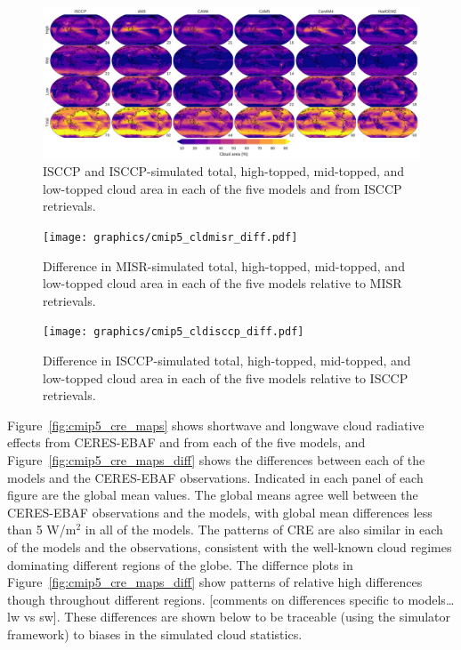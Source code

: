 \begin{figure}[htbp]
\centering
\includegraphics{graphics/cmip5_cldisccp.pdf}
\caption{\label{fig:cmip5_cldisccp_maps}ISCCP and ISCCP-simulated total,
high-topped, mid-topped, and low-topped cloud area in each of the five
models and from ISCCP retrievals.}\label{fig:cmip5ux5fcldisccpux5fmaps}
\end{figure}

\begin{figure}[htbp]
\centering
\texttt{[image: graphics/cmip5\_cldmisr\_diff.pdf]}
\caption{\label{fig:cmip5_cldmisr_maps_diff}Difference in MISR-simulated
total, high-topped, mid-topped, and low-topped cloud area in each of the
five models relative to MISR
retrievals.}\label{fig:cmip5ux5fcldmisrux5fmapsux5fdiff}
\end{figure}

\begin{figure}[htbp]
\centering
\texttt{[image: graphics/cmip5\_cldisccp\_diff.pdf]}
\caption{\label{fig:cmip5_cldisccp_maps_diff}Difference in
ISCCP-simulated total, high-topped, mid-topped, and low-topped cloud
area in each of the five models relative to ISCCP
retrievals.}\label{fig:cmip5ux5fcldisccpux5fmapsux5fdiff}
\end{figure}

Figure~\ref{fig:cmip5_cre_maps} shows shortwave and longwave cloud
radiative effects from CERES-EBAF and from each of the five models, and
Figure~\ref{fig:cmip5_cre_maps_diff} shows the differences between each
of the models and the CERES-EBAF observations. Indicated in each panel
of each figure are the global mean values. The global means agree well
between the CERES-EBAF observations and the models, with global mean
differences less than 5 W/m\(^2\) in all of the models. The patterns of
CRE are also similar in each of the models and the observations,
consistent with the well-known cloud regimes dominating different
regions of the globe. The differnce plots in
Figure~\ref{fig:cmip5_cre_maps_diff} show patterns of relative high
differences though throughout different regions. {[}comments on
differences specific to models\ldots{}lw vs sw{]}. These differences are
shown below to be traceable (using the simulator framework) to biases in
the simulated cloud statistics.

